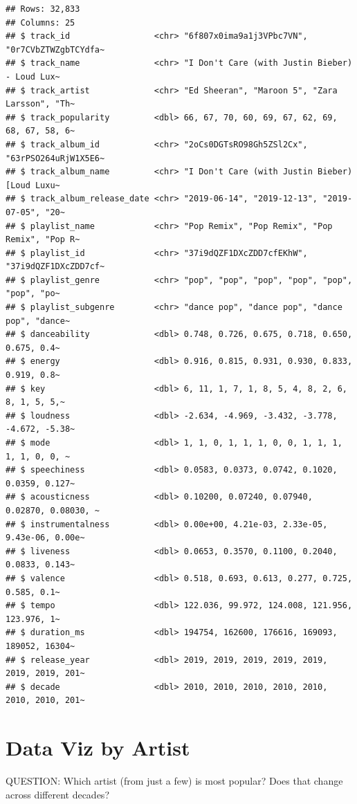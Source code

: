 \documentclass[
]{book}
\begin{document}
\begin{verbatim}
## Rows: 32,833
## Columns: 25
## $ track_id                 <chr> "6f807x0ima9a1j3VPbc7VN", "0r7CVbZTWZgbTCYdfa~
## $ track_name               <chr> "I Don't Care (with Justin Bieber) - Loud Lux~
## $ track_artist             <chr> "Ed Sheeran", "Maroon 5", "Zara Larsson", "Th~
## $ track_popularity         <dbl> 66, 67, 70, 60, 69, 67, 62, 69, 68, 67, 58, 6~
## $ track_album_id           <chr> "2oCs0DGTsRO98Gh5ZSl2Cx", "63rPSO264uRjW1X5E6~
## $ track_album_name         <chr> "I Don't Care (with Justin Bieber) [Loud Luxu~
## $ track_album_release_date <chr> "2019-06-14", "2019-12-13", "2019-07-05", "20~
## $ playlist_name            <chr> "Pop Remix", "Pop Remix", "Pop Remix", "Pop R~
## $ playlist_id              <chr> "37i9dQZF1DXcZDD7cfEKhW", "37i9dQZF1DXcZDD7cf~
## $ playlist_genre           <chr> "pop", "pop", "pop", "pop", "pop", "pop", "po~
## $ playlist_subgenre        <chr> "dance pop", "dance pop", "dance pop", "dance~
## $ danceability             <dbl> 0.748, 0.726, 0.675, 0.718, 0.650, 0.675, 0.4~
## $ energy                   <dbl> 0.916, 0.815, 0.931, 0.930, 0.833, 0.919, 0.8~
## $ key                      <dbl> 6, 11, 1, 7, 1, 8, 5, 4, 8, 2, 6, 8, 1, 5, 5,~
## $ loudness                 <dbl> -2.634, -4.969, -3.432, -3.778, -4.672, -5.38~
## $ mode                     <dbl> 1, 1, 0, 1, 1, 1, 0, 0, 1, 1, 1, 1, 1, 0, 0, ~
## $ speechiness              <dbl> 0.0583, 0.0373, 0.0742, 0.1020, 0.0359, 0.127~
## $ acousticness             <dbl> 0.10200, 0.07240, 0.07940, 0.02870, 0.08030, ~
## $ instrumentalness         <dbl> 0.00e+00, 4.21e-03, 2.33e-05, 9.43e-06, 0.00e~
## $ liveness                 <dbl> 0.0653, 0.3570, 0.1100, 0.2040, 0.0833, 0.143~
## $ valence                  <dbl> 0.518, 0.693, 0.613, 0.277, 0.725, 0.585, 0.1~
## $ tempo                    <dbl> 122.036, 99.972, 124.008, 121.956, 123.976, 1~
## $ duration_ms              <dbl> 194754, 162600, 176616, 169093, 189052, 16304~
## $ release_year             <dbl> 2019, 2019, 2019, 2019, 2019, 2019, 2019, 201~
## $ decade                   <dbl> 2010, 2010, 2010, 2010, 2010, 2010, 2010, 201~
\end{verbatim}

\hypertarget{data-viz-by-artist}{%
\section{Data Viz by Artist}\label{data-viz-by-artist}}

QUESTION: Which artist (from just a few) is most popular? Does that change across different decades?
\end{document}
